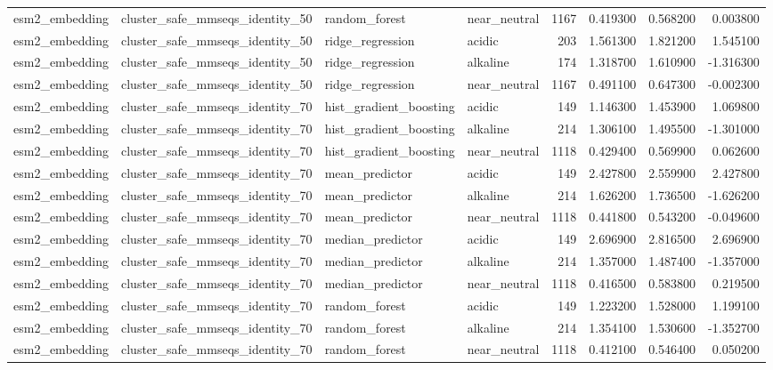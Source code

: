 \begin{longtable}{llllrrrr}
esm2\_embedding & cluster\_safe\_mmseqs\_identity\_50 & random\_forest & near\_neutral & 1167 & 0.419300 & 0.568200 & 0.003800 \\
esm2\_embedding & cluster\_safe\_mmseqs\_identity\_50 & ridge\_regression & acidic & 203 & 1.561300 & 1.821200 & 1.545100 \\
esm2\_embedding & cluster\_safe\_mmseqs\_identity\_50 & ridge\_regression & alkaline & 174 & 1.318700 & 1.610900 & -1.316300 \\
esm2\_embedding & cluster\_safe\_mmseqs\_identity\_50 & ridge\_regression & near\_neutral & 1167 & 0.491100 & 0.647300 & -0.002300 \\
esm2\_embedding & cluster\_safe\_mmseqs\_identity\_70 & hist\_gradient\_boosting & acidic & 149 & 1.146300 & 1.453900 & 1.069800 \\
esm2\_embedding & cluster\_safe\_mmseqs\_identity\_70 & hist\_gradient\_boosting & alkaline & 214 & 1.306100 & 1.495500 & -1.301000 \\
esm2\_embedding & cluster\_safe\_mmseqs\_identity\_70 & hist\_gradient\_boosting & near\_neutral & 1118 & 0.429400 & 0.569900 & 0.062600 \\
esm2\_embedding & cluster\_safe\_mmseqs\_identity\_70 & mean\_predictor & acidic & 149 & 2.427800 & 2.559900 & 2.427800 \\
esm2\_embedding & cluster\_safe\_mmseqs\_identity\_70 & mean\_predictor & alkaline & 214 & 1.626200 & 1.736500 & -1.626200 \\
esm2\_embedding & cluster\_safe\_mmseqs\_identity\_70 & mean\_predictor & near\_neutral & 1118 & 0.441800 & 0.543200 & -0.049600 \\
esm2\_embedding & cluster\_safe\_mmseqs\_identity\_70 & median\_predictor & acidic & 149 & 2.696900 & 2.816500 & 2.696900 \\
esm2\_embedding & cluster\_safe\_mmseqs\_identity\_70 & median\_predictor & alkaline & 214 & 1.357000 & 1.487400 & -1.357000 \\
esm2\_embedding & cluster\_safe\_mmseqs\_identity\_70 & median\_predictor & near\_neutral & 1118 & 0.416500 & 0.583800 & 0.219500 \\
esm2\_embedding & cluster\_safe\_mmseqs\_identity\_70 & random\_forest & acidic & 149 & 1.223200 & 1.528000 & 1.199100 \\
esm2\_embedding & cluster\_safe\_mmseqs\_identity\_70 & random\_forest & alkaline & 214 & 1.354100 & 1.530600 & -1.352700 \\
esm2\_embedding & cluster\_safe\_mmseqs\_identity\_70 & random\_forest & near\_neutral & 1118 & 0.412100 & 0.546400 & 0.050200 \\

\end{longtable}
